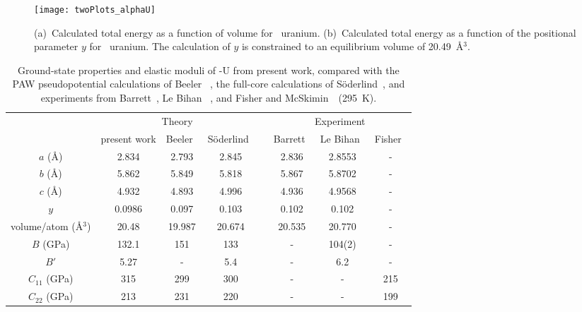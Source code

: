 \begin{figure}
	\centering
    \texttt{[image: twoPlots\_alphaU]}
    \caption[Energy vs volume plot for \textalpha-uranium]{(a)~Calculated total energy as a function of volume for
        \textalpha~uranium. (b)~Calculated total energy as a function of the
        positional parameter $y$ for \textalpha~uranium. The calculation of $y$
        is constrained to an equilibrium volume of 20.49~\AA$^3$.}
	\label{fig:alpha}
\end{figure}
 
\begin{table}
\small
\caption[Comparison of ground-state properties and elastic moduli of \textalpha-U with previous work]{Ground-state properties and elastic moduli of \textalpha-U from present work, compared with the PAW pseudopotential calculations of Beeler \etal~\cite{beeler2013first}, the full-core calculations of S{\"o}derlind~\cite{soderlind2002first}, and experiments from Barrett~\cite{barrett1963crystal}, Le Bihan \etal~\cite{le2003structural}, and Fisher and McSkimin~\cite{fisher1958adiabatic}~(295~K).}
\label{table:eq_al}
\begin{tabular}{cccccccc}
  \hline
    & \multicolumn{3}{c}{Theory}
    && \multicolumn{3}{c}{Experiment} \\
    \cline{2-4}\cline{6-8}
				 & present work  & Beeler~\cite{beeler2013first}  & S{\"o}derlind~\cite{soderlind2002first} && Barrett~\cite{barrett1963crystal} & Le Bihan~\cite{le2003structural} & Fisher~\cite{fisher1958adiabatic} \\ \hline 
$a$ (\AA)		 & 2.834		 & 2.793		 & 2.845	&&	2.836	& 2.8553 & -	\\
$b$ (\AA)		 & 5.862		 & 5.849		 & 5.818	&&	5.867	& 5.8702 & -	\\
$c$ (\AA)		 & 4.932		 & 4.893	     & 4.996	&&	4.936	& 4.9568 & -	\\
$y$ 			 & 0.0986		 & 0.097		 & 0.103	&&	0.102	& 0.102	 & -	\\
volume/atom (\AA$^3$) & 20.48		 & 19.987		 & 20.674	  && 20.535	& 20.770 & -	\\ 
$B$ (GPa)		 & 132.1		 & 151			 & 133		  && -		& 104(2) 	& -	\\
$B'$			 & 5.27			 & -			 & 5.4		  && -		&6.2		& -	\\
$C_{11}$ (GPa)		 & 315			 & 299			 & 300		  &&	-		&-		& 215 \\
$C_{22}$ (GPa)		 & 213			 & 231			 & 220		  &&	-		&-		&199 \\

\end{tabular}
\end{table}
